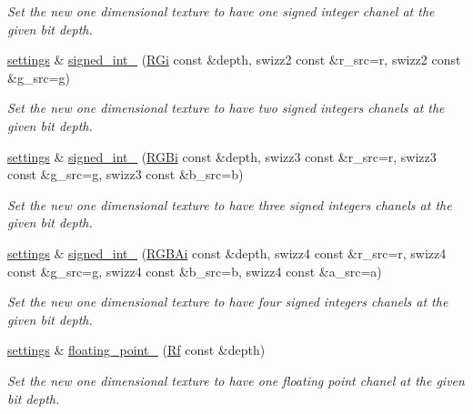 \begin{DoxyCompactItemize}
\begin{DoxyCompactList}\small\item\em Set the new one dimensional texture to have one signed integer chanel at the given bit depth. \end{DoxyCompactList}\item 
\hyperlink{classgfx_1_1texture__1D_1_1settings}{settings} \& \hyperlink{classgfx_1_1texture__1D_1_1settings_a0510d8c879b8d24e42b61052fb6fc0cb}{signed\-\_\-int\-\_} (\hyperlink{classgfx_1_1RGi}{R\-Gi} const \&depth, swizz2 const \&r\-\_\-src=r, swizz2 const \&g\-\_\-src=g)
\begin{DoxyCompactList}\small\item\em Set the new one dimensional texture to have two signed integers chanels at the given bit depth. \end{DoxyCompactList}\item 
\hyperlink{classgfx_1_1texture__1D_1_1settings}{settings} \& \hyperlink{classgfx_1_1texture__1D_1_1settings_a98fe117968a05b082042efbb7dfd512e}{signed\-\_\-int\-\_} (\hyperlink{classgfx_1_1RGBi}{R\-G\-Bi} const \&depth, swizz3 const \&r\-\_\-src=r, swizz3 const \&g\-\_\-src=g, swizz3 const \&b\-\_\-src=b)
\begin{DoxyCompactList}\small\item\em Set the new one dimensional texture to have three signed integers chanels at the given bit depth. \end{DoxyCompactList}\item 
\hyperlink{classgfx_1_1texture__1D_1_1settings}{settings} \& \hyperlink{classgfx_1_1texture__1D_1_1settings_a5d220cf00202541b3b8b42947244a0e1}{signed\-\_\-int\-\_} (\hyperlink{classgfx_1_1RGBAi}{R\-G\-B\-Ai} const \&depth, swizz4 const \&r\-\_\-src=r, swizz4 const \&g\-\_\-src=g, swizz4 const \&b\-\_\-src=b, swizz4 const \&a\-\_\-src=a)
\begin{DoxyCompactList}\small\item\em Set the new one dimensional texture to have four signed integers chanels at the given bit depth. \end{DoxyCompactList}\item 
\hyperlink{classgfx_1_1texture__1D_1_1settings}{settings} \& \hyperlink{classgfx_1_1texture__1D_1_1settings_a6536d267155160446db2e414646f97fe}{floating\-\_\-point\-\_} (\hyperlink{classgfx_1_1Rf}{Rf} const \&depth)
\begin{DoxyCompactList}\small\item\em Set the new one dimensional texture to have one floating point chanel at the given bit depth. \end{DoxyCompactList}\item 

\end{DoxyCompactItemize}
